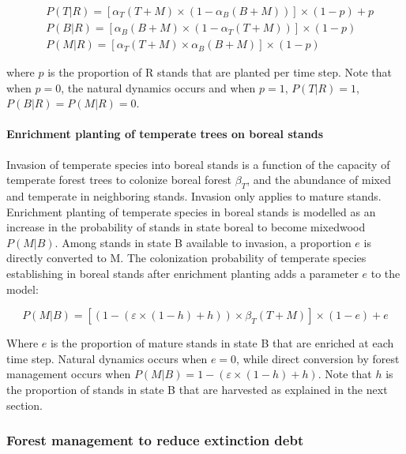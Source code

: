 \documentclass[12pt]{article}
\begin{document}
\begin{equation}
\begin{split}
&P(T|R) = [\alpha_T (T+M) \times (1-\alpha_B (B+M))] \times (1 - p) +  p \\[2pt]
&P(B|R) = [\alpha_B (B+M) \times (1-\alpha_T (T+M))] \times (1 - p) \\[2pt]
&P(M|R) = [\alpha_T (T+M) \times \alpha_B (B+M)] \times (1 - p)
\end{split}
\label{eq:plantation}\end{equation}

where \(p\) is the proportion of R stands that are planted per time
step. Note that when \(p=0\), the natural dynamics occurs and when
\(p=1\), \(P(T|R)=1\), \(P(B|R)=P(M|R)=0\).

\hypertarget{enrichment-planting-of-temperate-trees-on-boreal-stands}{%
\paragraph{Enrichment planting of temperate trees on boreal
stands}\label{enrichment-planting-of-temperate-trees-on-boreal-stands}}

Invasion of temperate species into boreal stands is a function of the
capacity of temperate forest trees to colonize boreal forest
\(\beta_T\), and the abundance of mixed and temperate in neighboring
stands. Invasion only applies to mature stands. Enrichment planting of
temperate species in boreal stands is modelled as an increase in the
probability of stands in state boreal to become mixedwood \(P(M|B)\).
Among stands in state B available to invasion, a proportion \(e\) is
directly converted to M. The colonization probability of temperate
species establishing in boreal stands after enrichment planting adds a
parameter \(e\) to the model:

\begin{equation}
P(M|B) = [(1- (\varepsilon \times (1 - h) + h)) \times \beta_T(T + M)] \times (1-e) + e
\label{eq:enrichplanting}\end{equation}

Where \(e\) is the proportion of mature stands in state B that are
enriched at each time step. Natural dynamics occurs when \(e=0\), while
direct conversion by forest management occurs when
\(P(M|B)= 1- (\varepsilon \times (1 - h) + h)\). Note that \(h\) is the
proportion of stands in state B that are harvested as explained in the
next section.

\hypertarget{forest-management-to-reduce-extinction-debt}{%
\subsubsection{Forest management to reduce extinction
debt}\label{forest-management-to-reduce-extinction-debt}}
\end{document}
